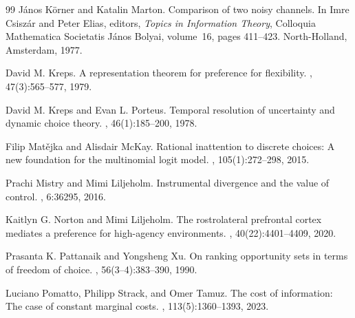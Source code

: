 \documentclass[11pt,a4paper]{article}
\theoremstyle{definition}
\newcommand{\1}{\mathbf 1}
\begin{document}
\begin{thebibliography}{99}
J\'anos K\"orner and Katalin Marton.
\newblock Comparison of two noisy channels.
\newblock In Imre Csisz\'ar and Peter Elias, editors, {\em Topics in Information Theory}, Colloquia Mathematica
  Societatis J\'anos Bolyai, volume~16, pages 411--423. North-Holland, Amsterdam, 1977.

David M. Kreps.
\newblock A representation theorem for preference for flexibility.
, 47(3):565--577, 1979.

David M. Kreps and Evan L. Porteus.
\newblock Temporal resolution of uncertainty and dynamic choice theory.
, 46(1):185--200, 1978.


Filip Mat\v{e}jka and Alisdair McKay.
\newblock Rational inattention to discrete choices: A new foundation for the multinomial logit model.
, 105(1):272--298, 2015.

Prachi Mistry and Mimi Liljeholm.
\newblock Instrumental divergence and the value of control.
, 6:36295, 2016.

Kaitlyn G. Norton and Mimi Liljeholm.
\newblock The rostrolateral prefrontal cortex mediates a preference for high-agency environments.
, 40(22):4401--4409, 2020.


Prasanta K. Pattanaik and Yongsheng Xu.
\newblock On ranking opportunity sets in terms of freedom of choice.
, 56(3--4):383--390, 1990.

Luciano Pomatto, Philipp Strack, and Omer Tamuz.
\newblock The cost of information: The case of constant marginal costs.
, 113(5):1360--1393, 2023.


\end{thebibliography}
\end{document}
